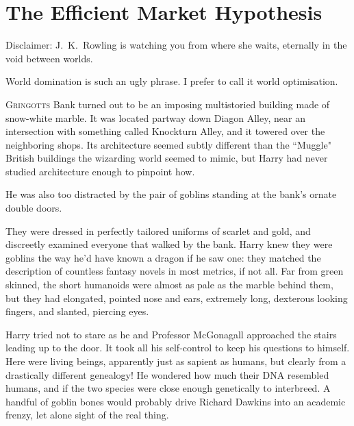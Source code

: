 \chapter[The Efficient Market Hypothesis]{The Efficient Market Hypothesis\protect\authorsnotefootnotemark}

\begin{chapterOpeningAuthorNote}
Disclaimer: J.~K.~Rowling is watching you from where she waits, eternally in the void between worlds.
\end{chapterOpeningAuthorNote}
\begin{chapterOpeningQuote}
World domination is such an ugly phrase. I prefer to call it world optimisation.
\end{chapterOpeningQuote}


\lettrine{G}{ringotts} Bank turned out to be an imposing multistoried building made of snow-white marble. It was located partway down Diagon Alley, near an intersection with something called Knockturn Alley, and it towered over the neighboring shops. Its architecture seemed subtly different than the ``Muggle" British buildings the wizarding world seemed to mimic, but Harry had never studied architecture enough to pinpoint how.

He was also too distracted by the pair of goblins standing at the bank's ornate double doors.

They were dressed in perfectly tailored uniforms of scarlet and gold, and discreetly examined everyone that walked by the bank. Harry knew they were goblins the way he'd have known a dragon if he saw one: they matched the description of countless fantasy novels in most metrics, if not all. Far from green skinned, the short humanoids were almost as pale as the marble behind them, but they had elongated, pointed nose and ears, extremely long, dexterous looking fingers, and slanted, piercing eyes.

Harry tried not to stare as he and Professor McGonagall approached the stairs leading up to the door. It took all his self-control to keep his questions to himself. Here were living beings, apparently just as sapient as humans, but clearly from a drastically different genealogy! He wondered how much their DNA resembled humans, and if the two species were close enough genetically to interbreed. A handful of goblin bones would probably drive Richard Dawkins into an academic frenzy, let alone sight of the real thing.

